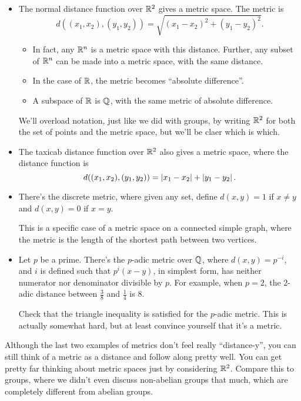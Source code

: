 \documentclass[11pt,paper=letter]{scrartcl}
\begin{document}
\begin{itemize}
  \item The normal distance function over $\mathbb R^2$ gives a metric space. The metric is $$d((x_1, x_2 ), (y_1, y_2 )) = \sqrt{ \left( x_1 - x_2 \right)^{2} + \left( y_1 - y_2 \right)^{2} }. $$
  \begin{itemize}
    \item In fact, any $\mathbb R^n$ is a metric space with this distance. Further, any subset of $\mathbb R^n$ can be made into a metric space, with the same distance.
    \item In the case of $\mathbb R$, the metric becomes ``absolute difference''.
    \item A subspace of $\mathbb R$ is $\mathbb Q$, with the same metric of absolute difference.
  \end{itemize}
  \begin{remboxed}
    We'll overload notation, just like we did with groups, by writing $\mathbb R^2$ for both the set of points and the metric space, but we'll be claer which is which.
  \end{remboxed}
  \item The taxicab distance function over $\mathbb R^2$ also gives a metric space, where the distance function is \[
      d((x_1, x_2 ), (y_1, y_2 )) = \left\lvert x_1 - x_2  \right\rvert + \left\lvert  y_1 - y_2 \right\rvert.
    \]
  \item There's the discrete metric, where given any set, define $d(x, y) = 1$ if $x \ne y$ and $d(x, y) = 0$ if $x = y$.
  \begin{remboxed}
    This is a specific case of a metric space on a connected simple graph, where the metric is the length of the shortest path between two vertices.
  \end{remboxed}
  \item Let $p$ be a prime. There's the $p$-adic metric over $\mathbb Q$, where $d(x, y) = p^{-i}$, and $i$ is defined such that $p^i(x - y)$, in simplest form, has neither numerator nor denominator divisible by $p$. For example, when $p = 2$, the $2$-adic distance between $\frac38$ and $\frac14$ is $8$.
  \begin{exrboxed}
    Check that the triangle inequality is satisfied for the $p$-adic metric. This is actually somewhat hard, but at least convince yourself that it's a metric.
  \end{exrboxed}
\end{itemize}

\begin{remboxed}
  Although the last two examples of metrics don't feel really ``distance-y'', you can still think of a metric as a distance and follow along pretty well. You can get pretty far thinking about metric spaces just by considering $ \mathbb R^{2} $. Compare this to groups, where we didn't even discuss non-abelian groups that much, which are completely different from abelian groups.
\end{remboxed}
\end{document}
